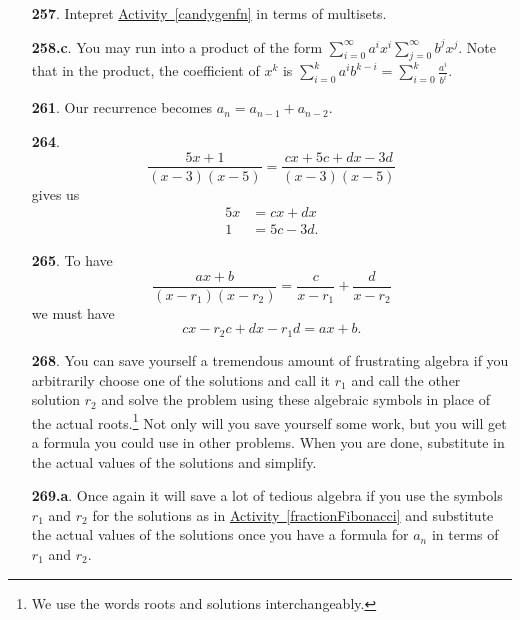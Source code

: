 \documentclass[10pt,]{book}
\theoremstyle{plain}
\theoremstyle{definition}
\theoremstyle{definition}
\theoremstyle{definition}
\numberwithin{equation}{chapter}
\newcommand{\amp}{&}
\begin{document}
\begin{itemize}[itemsep=1em]
\item[\textbf{257}.]\hypertarget{p-1330}{}%
Intepret \hyperref[candygenfn]{Activity~\ref{candygenfn}} in terms of multisets.%

\item[\textbf{258.c}.]\hypertarget{p-1340}{}%
You may run into a product of the form \(\sum_{i=0}^\infty a^ix^i\sum_{j=0}^\infty b^jx^j\). Note that in the product, the coefficient of \(x^k\) is \(\sum_{i=0}^k a^ib^{k-i} = \sum_{i=0}^k \frac{a^i}{b^i}\).%

\item[\textbf{261}.]\hypertarget{p-1348}{}%
Our recurrence becomes \(a_n = a_{n-1} + a_{n-2}\).%

\item[\textbf{264}.]\hypertarget{p-1357}{}%
%
\begin{equation*}
\frac{5x+1}{(x-3)(x-5)} = \frac{cx+5c+dx-3d}{(x-3)(x-5)}
\end{equation*}
gives us%
\begin{align*}
5x \amp = cx+dx\\
1 \amp= 5c-3d\text{.}
\end{align*}
%

\item[\textbf{265}.]\hypertarget{p-1360}{}%
To have%
\begin{equation*}
\frac{ax+b}{(x-r_1)(x-r_2)} = \frac{c}{x-r_1} + \frac{d}{x-r_2}
\end{equation*}
we must have%
\begin{equation*}
cx-r_2c+dx-r_1d =ax+b\text{.}
\end{equation*}
%

\item[\textbf{268}.]\hypertarget{p-1368}{}%
You can save yourself a tremendous amount of frustrating algebra if you arbitrarily choose one of the solutions and call it \(r_1\) and call the other solution \(r_2\) and solve the problem using these algebraic symbols in place of the actual roots.\footnote{We use the words roots and solutions interchangeably.\label{fn-18}} Not only will you save yourself some work, but you will get a formula you could use in other problems. When you are done, substitute in the actual values of the solutions and simplify.%

\item[\textbf{269.a}.]\hypertarget{p-1371}{}%
Once again it will save a lot of tedious algebra if you use the symbols \(r_1\) and \(r_2\) for the solutions as in \hyperref[fractionFibonacci]{Activity~\ref{fractionFibonacci}} and substitute the actual values of the solutions once you have a formula for \(a_n\) in terms of \(r_1\) and \(r_2\).%


\end{itemize}
\end{document}
